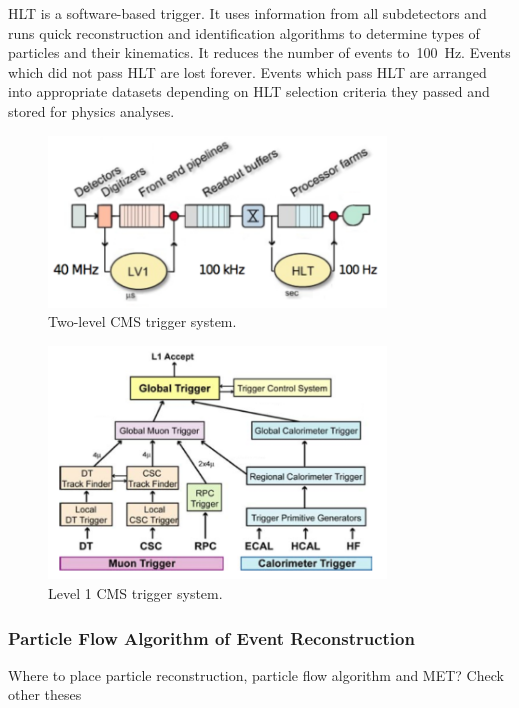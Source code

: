 HLT is a software-based trigger. It uses information from all subdetectors and runs quick reconstruction and identification algorithms to determine types of particles and their kinematics. It reduces the number of events to~100~Hz. Events which did not pass HLT are lost forever. Events which pass HLT are arranged into appropriate datasets depending on HLT selection criteria they passed and stored for physics analyses.\\

\begin{figure}[htb]
  \begin{center}
    \includegraphics[width=0.8\textwidth]{../figs/Exp/trigger_2level.png}
    \caption{Two-level CMS trigger system.}
    \label{fig:trigger_2level}
  \end{center}
\end{figure}

\begin{figure}[htb]
  \begin{center}
    \includegraphics[width=0.8\textwidth]{../figs/Exp/trigger_L1.png}
    \caption{Level 1 CMS trigger system.}
    \label{fig:trigger_L1}
  \end{center}
\end{figure}


\subsubsection{Particle Flow Algorithm of Event Reconstruction}
Where to place particle reconstruction, particle flow algorithm and MET? Check other theses

